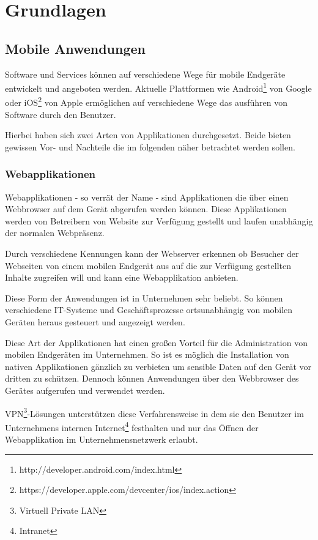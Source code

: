 \section{Grundlagen}
\subsection{Mobile Anwendungen}
Software und Services können auf verschiedene Wege für mobile Endgeräte entwickelt und angeboten werden. Aktuelle Plattformen wie Android\footnote{http://developer.android.com/index.html} von Google oder iOS\footnote{https://developer.apple.com/devcenter/ios/index.action} von Apple ermöglichen auf verschiedene Wege das ausführen von Software durch den Benutzer.

Hierbei haben sich zwei Arten von Applikationen durchgesetzt. Beide bieten gewissen Vor- und Nachteile die im folgenden näher betrachtet werden sollen.

\subsubsection{Webapplikationen}

Webapplikationen - so verrät der Name - sind Applikationen die über einen Webbrowser auf dem Gerät abgerufen werden können. Diese Applikationen werden von Betreibern von Website zur Verfügung gestellt und laufen unabhängig der normalen Webpräsenz.

Durch verschiedene Kennungen kann der Webserver erkennen ob Besucher der Webseiten von einem mobilen Endgerät aus auf die zur Verfügung gestellten Inhalte zugreifen will und kann eine Webapplikation anbieten.

Diese Form der Anwendungen ist in Unternehmen sehr beliebt. So können verschiedene IT-Systeme und Geschäftsprozesse ortsunabhängig von mobilen Geräten heraus gesteuert und angezeigt werden.

Diese Art der Applikationen hat einen großen Vorteil für die Administration von mobilen Endgeräten im Unternehmen. So ist es möglich die Installation von nativen Applikationen gänzlich zu verbieten um sensible Daten auf den Gerät vor dritten zu schützen. Dennoch können Anwendungen über den Webbrowser des Gerätes aufgerufen und verwendet werden.

VPN\footnote{Virtuell Private LAN}-Lösungen unterstützen diese Verfahrensweise in dem sie den Benutzer im Unternehmens internen Internet\footnote{Intranet} festhalten und nur das Öffnen der Webapplikation im Unternehmensnetzwerk erlaubt.

